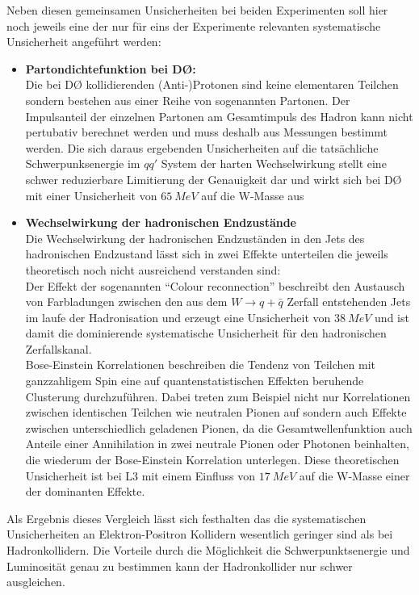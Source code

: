 \documentclass[a4paper,12pt]{article}
\begin{document}
Neben diesen gemeinsamen Unsicherheiten bei beiden Experimenten soll hier noch jeweils eine der nur für eins der Experimente relevanten
systematische Unsicherheit angeführt werden:
\begin{itemize}
	\item \textbf{Partondichtefunktion bei DØ:}\\
	Die bei DØ kollidierenden (Anti-)Protonen sind keine elementaren Teilchen sondern bestehen aus einer Reihe von sogenannten Partonen. Der
	Impulsanteil der einzelnen Partonen am Gesamtimpuls des Hadron kann nicht pertubativ berechnet werden und muss deshalb aus Messungen bestimmt
	werden. Die sich daraus ergebenden Unsicherheiten auf die tatsächliche Schwerpunksenergie im $qq'$ System der harten Wechselwirkung stellt eine
	schwer reduzierbare Limitierung der Genauigkeit dar und wirkt sich bei DØ mit einer Unsicherheit von $\SI{65}{MeV}$ auf die W-Masse aus
	\item \textbf{Wechselwirkung der hadronischen Endzustände}\\
	Die Wechselwirkung der hadronischen Endzuständen in den Jets des hadronischen Endzustand lässt sich in zwei Effekte unterteilen die jeweils
	theoretisch noch nicht ausreichend verstanden sind: \\
	Der Effekt der sogenannten "`Colour reconnection"' beschreibt den Austausch von Farbladungen zwischen
	den aus dem $W\rightarrow q+\bar{q}$ Zerfall entstehenden Jets im laufe der Hadronisation und erzeugt eine Unsicherheit von $\SI{38}{MeV}$
	und ist damit die dominierende systematische Unsicherheit für den hadronischen Zerfallskanal.\\
	Bose-Einstein Korrelationen beschreiben die Tendenz von Teilchen mit ganzzahligem Spin eine auf quantenstatistischen Effekten beruhende Clusterung
	durchzuführen. Dabei treten zum Beispiel nicht nur Korrelationen zwischen identischen Teilchen wie neutralen Pionen auf sondern auch Effekte zwischen
	unterschiedlich geladenen Pionen, da die Gesamtwellenfunktion auch Anteile einer Annihilation in
	zwei neutrale Pionen oder Photonen beinhalten, die
	wiederum der Bose-Einstein Korrelation unterlegen. Diese theoretischen Unsicherheit ist bei L3 mit einem Einfluss von $\SI{17}{MeV}$ auf die W-Masse
	einer der dominanten Effekte.
\end{itemize}
Als Ergebnis dieses Vergleich lässt sich festhalten das die systematischen Unsicherheiten an Elektron-Positron Kollidern wesentlich geringer sind als
bei Hadronkollidern. Die Vorteile durch die Möglichkeit die Schwerpunktsenergie und Luminosität genau zu bestimmen kann der Hadronkollider nur schwer ausgleichen.
\end{document}
